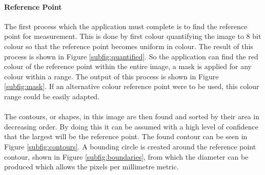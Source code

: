 		\paragraph{Reference Point}
			The first process which the application must complete is to find the reference point for measurement. This is done by first colour quantifying the image to 8 bit colour so that the reference point becomes uniform in colour. The result of this process is shown in Figure \ref{subfig:quantified}. So the application can find the red colour of the reference point within the entire image, a mask is applied for any colour within a range. The output of this process is shown in Figure \ref{subfig:mask}. If an alternative colour reference point were to be used, this colour range could be easily adapted.
			\\\\
			The contours, or shapes, in this image are then found and sorted by their area in decreasing order. By doing this it can be assumed with a high level of confidence that the largest will be the reference point. The found contour can be seen in Figure \ref{subfig:contours}. A bounding circle is created around the reference point contour, shown in Figure \ref{subfig:boundaries}, from which the diameter can be produced which allows the pixels per millimetre metric.
